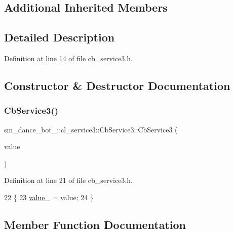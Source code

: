 \subsection*{Additional Inherited Members}


\subsection{Detailed Description}


Definition at line 14 of file cb\+\_\+service3.\+h.



\subsection{Constructor \& Destructor Documentation}
\mbox{\label{classsm__dance__bot__2_1_1cl__service3_1_1CbService3_a62be950b5107ee476814a27b99e6743c}} 
\subsubsection{\texorpdfstring{Cb\+Service3()}{CbService3()}}
{\footnotesize\ttfamily sm\+\_\+dance\+\_\+bot\+\_\+::cl\+\_\+service3\+::\+Cb\+Service3\+::\+Cb\+Service3 (\begin{DoxyParamCaption}\item[{\hyperlink{namespacesm__dance__bot__2_1_1cl__service3_adfc3ce70a327b24b4fb6d6b02803caff}{Service3\+Command}}]{value }\end{DoxyParamCaption})\hspace{0.3cm}{\ttfamily [inline]}}



Definition at line 21 of file cb\+\_\+service3.\+h.


\begin{DoxyCode}
22   \{
23     \hyperlink{classsm__dance__bot__2_1_1cl__service3_1_1CbService3_ae48a64bc675b548fcb9c059831e39e37}{value\_} = value;
24   \}
\end{DoxyCode}


\subsection{Member Function Documentation}
\mbox{\label{classsm__dance__bot__2_1_1cl__service3_1_1CbService3_a179e43cc240f53f9c49c67094e41d75f}} 
